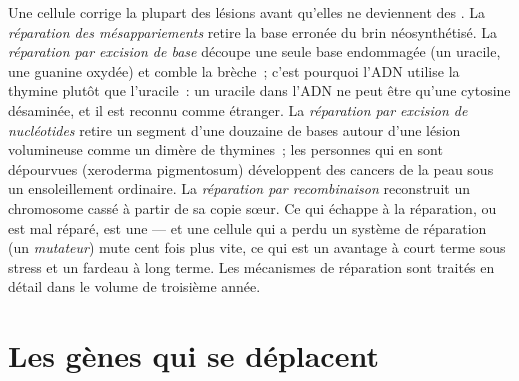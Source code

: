 \begin{proposition}\label{prop:b2:genome-diversification:repair}
Une cellule corrige la plupart des lésions avant qu'elles ne deviennent
des . La \emph{réparation des mésappariements} retire la base
erronée du brin néosynthétisé. La \emph{réparation par excision de base}
découpe une seule base endommagée (un uracile, une guanine oxydée) et
comble la brèche~; c'est pourquoi l'ADN utilise la thymine plutôt que
l'uracile~: un uracile dans l'ADN ne peut être qu'une cytosine
désaminée, et il est reconnu comme étranger. La \emph{réparation par
excision de nucléotides} retire un segment d'une douzaine de bases
autour d'une lésion volumineuse comme un dimère de thymines~; les
personnes qui en sont dépourvues (xeroderma pigmentosum) développent des
cancers de la peau sous un ensoleillement ordinaire. La
\emph{réparation par recombinaison} reconstruit un chromosome cassé à
partir de sa copie sœur. Ce qui échappe à la réparation, ou est mal
réparé, est une  --- et une cellule qui a perdu un système de
réparation (un \emph{mutateur}) mute cent fois plus vite, ce qui est un
avantage à court terme sous stress et un fardeau à long terme. Les
mécanismes de réparation sont traités en détail dans le volume de
troisième année.
\end{proposition}

\section{Les gènes qui se déplacent}

